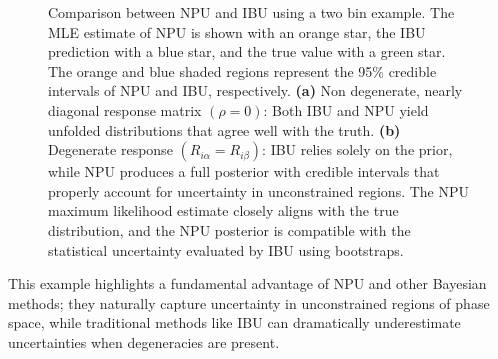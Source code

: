 \begin{figure}
    \centering
    \caption[2 bin example]{Comparison between NPU and IBU using a two bin example.
    The MLE estimate of NPU is shown with an orange star, the IBU prediction with a blue star, and the true value with a green star.
    The orange and blue shaded regions represent the 95\% credible intervals of NPU and IBU, respectively.
    \textbf{(a)} Non degenerate, nearly diagonal response matrix $(\rho = 0)$: 
    Both IBU and NPU yield unfolded distributions that agree well with the truth.
    \textbf{(b)} Degenerate response $(R_{i\alpha} = R_{i\beta})$: 
    IBU relies solely on the prior, while NPU produces a full posterior with credible intervals that properly account for uncertainty in unconstrained regions.
    The NPU maximum likelihood estimate closely aligns with the true distribution, and the NPU posterior is compatible with the statistical uncertainty evaluated by IBU using bootstraps.\protect{\footnotemark}
    }
    \label{fig:2bin}
\end{figure}

        This example highlights a fundamental advantage of NPU and other Bayesian methods;
        they naturally capture uncertainty in unconstrained regions of phase space, while traditional methods like IBU can dramatically underestimate uncertainties when degeneracies are present.
